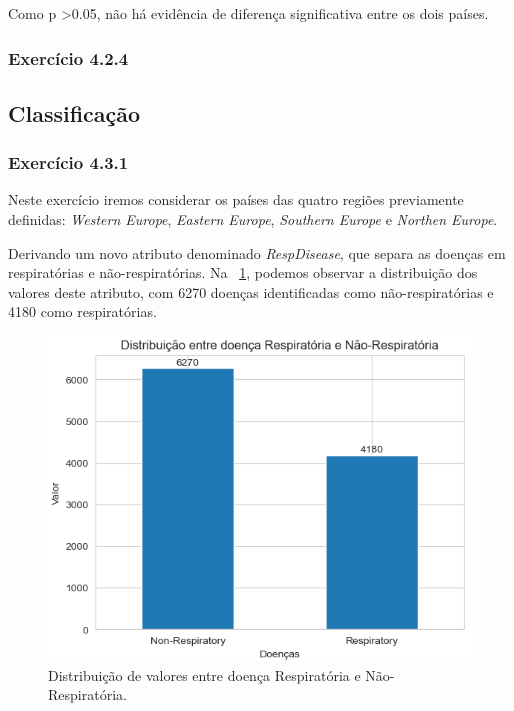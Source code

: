 \documentclass[conference]{IEEEtran}
\begin{document}
Como p \textgreater 0.05, não há evidência de diferença significativa entre os dois países. 
\medskip
\subsubsection{\textbf{Exercício 4.2.4}}

	
\subsection{Classificação}\label{AA}

\subsubsection{\textbf{Exercício 4.3.1}}

Neste exercício iremos considerar os países das quatro regiões previamente definidas: \textit{Western Europe}, \textit{Eastern Europe}, \textit{Southern Europe} e \textit{Northen Europe}.

Derivando um novo atributo denominado \textit{RespDisease}, que separa as doenças em respiratórias e não-respiratórias. Na \figurename~\ref{fig:grafico_doenca_respir}, podemos observar a distribuição dos valores deste atributo, com 6270 doenças identificadas como não-respiratórias e 4180 como respiratórias.


\begin{figure}[h]
	\centering
	\includegraphics[width=0.9\linewidth]{grafico_doenca_respir}
	\caption{Distribuição de valores entre doença Respiratória e Não-Respiratória.}
	\label{fig:grafico_doenca_respir}
\end{figure}
\end{document}
